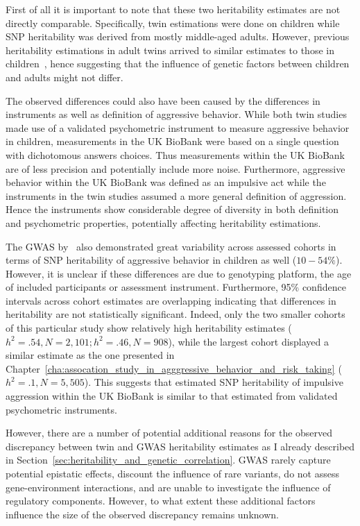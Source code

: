 First of all it is important to note that these two heritability estimates are not directly comparable.
Specifically, twin estimations were done on children while SNP heritability was derived from mostly middle-aged adults.
However, previous heritability estimations in adult twins arrived to similar estimates to those in children~\cite{Miles1997a}, hence suggesting that the influence of genetic factors between children and adults might not differ.

The observed differences could also have been caused by the differences in  instruments as well as definition of aggressive behavior.
While both  twin studies made use of a validated psychometric instrument to measure aggressive behavior in children, measurements in the UK BioBank were based on a single question with dichotomous answers choices.
Thus measurements within the UK BioBank are of less precision and potentially include more noise.
Furthermore, aggressive behavior within the UK BioBank was defined as an impulsive act while the  instruments in the twin studies assumed a more general definition of aggression.
Hence the  instruments show considerable degree of diversity in both definition and psychometric properties, potentially affecting heritability estimations.

The GWAS by~\citet{Pappa2016a} also demonstrated great variability across assessed cohorts in terms of SNP heritability of aggressive behavior in children as well ($10-54\%$).
However, it is unclear if these differences are due to genotyping platform, the age of included participants or  assessment instrument.
Furthermore, 95\% confidence intervals across cohort estimates are overlapping indicating that differences in heritability are not statistically significant.
Indeed, only the two smaller cohorts of this particular study show relatively high heritability estimates ($h^2=.54, N=2,101; h^2=.46, N=908$), while the largest cohort displayed a similar estimate as the one presented in Chapter~\ref{cha:assocation_study_in_agggressive_behavior_and_risk_taking} ($h^2=.1, N=5,505$).
This suggests that estimated SNP heritability of impulsive aggression within the UK BioBank is similar to that estimated from validated psychometric instruments. 

However, there are a number of potential additional reasons for the observed discrepancy between twin and GWAS heritability estimates as I already described in Section~\ref{sec:heritability_and_genetic_correlation}.
GWAS rarely capture potential epistatic effects, discount the influence of rare variants,  do not assess gene-environment interactions, and are unable to investigate the influence of regulatory components. 
However, to what extent these additional factors influence the size of the observed discrepancy remains unknown.

